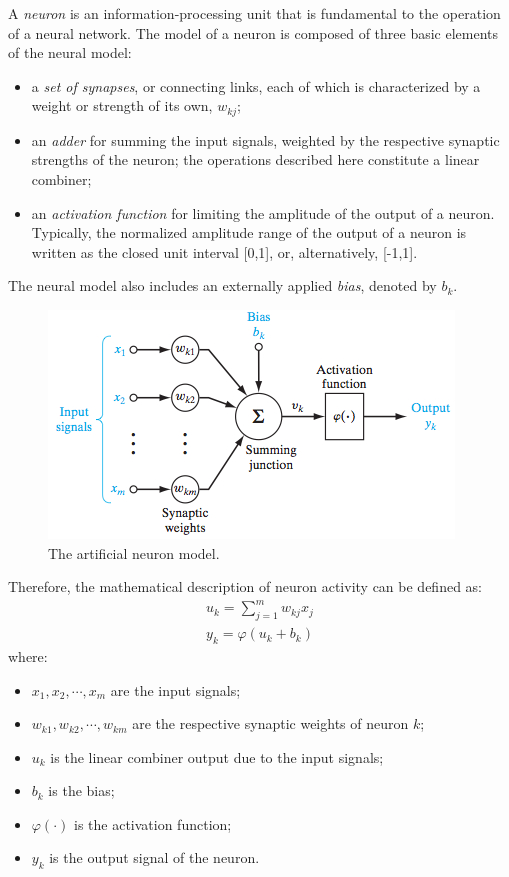 A \textit{neuron} is an information-processing unit that is fundamental to the operation of a neural network.
The model of a neuron is composed of three basic elements of the neural model:
\begin{itemize}
	\item a \textit{set of synapses}, or connecting links, each of which is characterized by a weight or strength of its own, $w_{kj}$;
	\item an \textit{adder} for summing the input signals, weighted by the respective synaptic strengths of the neuron; the operations described here constitute a linear combiner;
	\item an \textit{activation function} for limiting the amplitude of the output of a neuron. Typically, the normalized amplitude range of the output of a neuron is written as the closed unit interval [0,1], or, alternatively, [-1,1].
\end{itemize}
The neural model also includes an externally applied \textit{bias}, denoted by $b_k$.

\begin{figure}[t]
	\centering
	\includegraphics[width=0.8\linewidth]{img/NeuronModel.jpg}
	\caption{The artificial neuron model.}
\end{figure}

Therefore, the mathematical description of neuron activity can be defined as:
\begin{eqnarray}
{ u }_{ k }=\sum _{ j=1 }^{ m }{ { w }_{ kj } } { x }_{ j }\\ 
{ y }_{ k }=\varphi \left( { u }_{ k }+b_{ k } \right)
\end{eqnarray}
where:
\begin{itemize}
	\item ${ x }_{ 1 },{ x }_{ 2 },\cdots ,{ x }_{ m }$ are the input signals;
	\item ${ w }_{ k1 },{ w }_{ k2 },\cdots ,{ w }_{ km }$ are the respective synaptic weights of neuron $k$;
	\item $u_k$ is the linear combiner output due to the input signals;
	\item $b_k$ is the bias;
	\item $\varphi(\cdot)$ is the activation function;
	\item $y_k$ is the output signal of the neuron.
\end{itemize}

